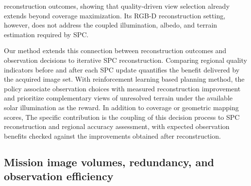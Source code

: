 reconstruction outcomes, showing that quality-driven view selection already extends beyond coverage maximization. Its RGB-D reconstruction setting, however, does not address the coupled illumination, albedo, and terrain estimation required by SPC.

Our method extends this connection between reconstruction outcomes and observation decisions to iterative SPC reconstruction. Comparing regional quality indicators before and after each SPC update quantifies the benefit delivered by the acquired image set. With reinforcement learning based planning method, the policy associate observation choices with measured reconstruction improvement and prioritize complementary views of unresolved terrain under the available solar illumination as the reward. In addition to coverage or geometric mapping scores, The specific contribution is the coupling of this decision process to SPC reconstruction and regional accuracy assessment, with expected observation benefits checked against the improvements obtained after reconstruction.

\subsection{Mission image volumes, redundancy, and observation efficiency}
\label{subsec:mission-image-efficiency}

